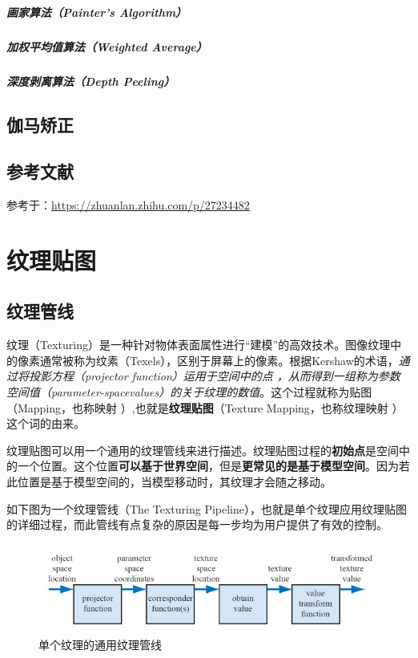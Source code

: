 \documentclass[UTF8,a4paper,12pt]{ctexbook}
\begin{document}
			\paragraph{画家算法（Painter's Algorithm）}
			
			\paragraph{加权平均值算法（Weighted Average）}
			
			\paragraph{深度剥离算法（Depth Peeling）}

	\section{伽马矫正}
	
	\section{参考文献}
			参考于：\url{https://zhuanlan.zhihu.com/p/27234482}
			
\chapter{纹理贴图}
	\section{纹理管线}
		纹理（Texturing）是一种针对物体表面属性进行“建模”的高效技术。图像纹理中的像素通常被称为纹素（Texels），区别于屏幕上的像素。根据Kershaw的术语，\textit{通过将投影方程（projector function）运用于空间中的点 ，从而得到一组称为参数空间值（parameter-spacevalues）的关于纹理的数值}。这个过程就称为贴图（Mapping，也称映射 ）,也就是\textbf{纹理贴图}（Texture Mapping，也称纹理映射 ）这个词的由来。
		
		纹理贴图可以用一个通用的纹理管线来进行描述。纹理贴图过程的\textbf{初始点}是空间中的一个位置。这个位置\textbf{可以基于世界空间}，但是\textbf{更常见的是基于模型空间}。因为若此位置是基于模型空间的，当模型移动时，其纹理才会随之移动。
		
		如下图为一个纹理管线（The Texturing Pipeline），也就是单个纹理应用纹理贴图的详细过程，而此管线有点复杂的原因是每一步均为用户提供了有效的控制。
			\begin{figure}[H]
				\centering
				\includegraphics[scale=0.67]{TexturePipeline}
				\caption{单个纹理的通用纹理管线}
			\end{figure}
			
\end{document}
